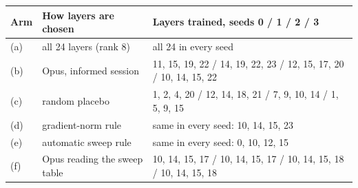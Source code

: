 \begin{tabular}{llp{.5\linewidth}}
\toprule
\textbf{Arm} & \textbf{How layers are chosen} & \textbf{Layers trained, seeds 0 / 1 / 2 / 3} \\
\midrule
(a) & all 24 layers (rank 8) & all 24 in every seed \\
(b) & Opus, informed session & 11, 15, 19, 22 / 14, 19, 22, 23 / 12, 15, 17, 20 / 10, 14, 15, 22 \\
(c) & random placebo & 1, 2, 4, 20 / 12, 14, 18, 21 / 7, 9, 10, 14 / 1, 5, 9, 15 \\
(d) & gradient-norm rule & same in every seed: 10, 14, 15, 23 \\
(e) & automatic sweep rule & same in every seed: 0, 10, 12, 15 \\
(f) & Opus reading the sweep table & 10, 14, 15, 17 / 10, 14, 15, 17 / 10, 14, 15, 18 / 10, 14, 15, 18 \\
\bottomrule
\end{tabular}
